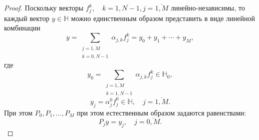 \begin{proof}
     Поскольку векторы \( f_j^k, \quad k=\overline{1,N-1},j=\overline{1,M} \) линейно-независимы,
     то каждый вектор \( y \in \mathbb{H} \) можно единственным образом представить в виде линейной комбинации
     \[
        y = \sum_{\substack{j=\overline{1,M}\\ k=\overline{0,N-1}}} \alpha_{j,k} f_j^k
          = y_0 + y_1 + \cdots + y_M,
        \]
     где
     \[
         y_0 = \sum_{\substack{j=\overline{1,M}\\ k=\overline{1,N-1}}} \alpha_{j,k} f_j^k \in \mathbb{H}_0,
         \]
     \[
         y_j = \alpha_j^0 f_j^0 \in \mathbb{H}, \quad j=\overline{1,M}.
         \]
     При этом \( P_0, P_1, \ldots, P_M \) при этом естественным образом задаются равенствами:
     \[
        P_j y = y_j, \quad j=\overline{0,M}.
        \]
     

 \end{proof}

